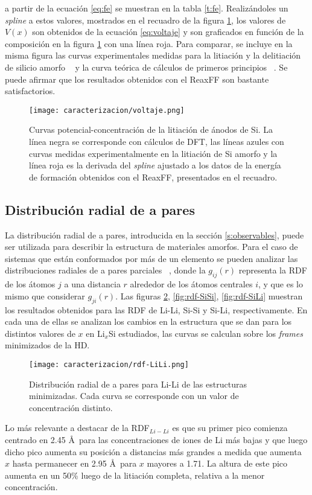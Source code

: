a partir de la ecuación \ref{eq:fe} se muestran en la tabla \ref{t:fe}. 
Realizándoles un \textit{spline} a estos valores, mostrados en el recuadro de la
figura \ref{fig:voltaje}, los valores de $V(x)$ son obtenidos de la ecuación
\ref{eq:voltaje} y son graficados en función de la composición en la figura 
\ref{fig:voltaje} con una línea roja. Para comparar, se incluye en la misma figura
las curvas experimentales medidas para la litiación y la delitiación de silicio
amorfo ~\cite{hatchard2004} y la curva teórica de cálculos de primeros principios 
~\cite{chevrier2009}. Se puede afirmar que los resultados obtenidos con el ReaxFF 
son bastante satisfactorios.
\begin{figure}[th]
    \centering
    \texttt{[image: caracterizacion/voltaje.png]}
    \caption{Curvas potencial-concentración de la litiación de ánodos de Si.
    La línea negra se corresponde con cálculos de DFT, las líneas azules con 
    curvas medidas experimentalmente en la litiación de Si amorfo y la línea 
    roja es la derivada del \textit{spline} ajustado a los datos de la energía 
    de formación obtenidos con el ReaxFF, presentados en el recuadro.}
    \label{fig:voltaje}
\end{figure}

\subsection{Distribución radial de a pares}

La distribución radial de a pares, introducida en la sección \ref{s:observables},
puede ser utilizada para describir la estructura de materiales amorfos. Para el 
caso de sistemas que están conformados por más de un elemento se pueden analizar 
las distribuciones radiales de a pares parciales ~\cite{lamparter1995}, donde la 
$g_{ij}(r)$ representa la RDF de los átomos $j$ a una distancia $r$ alrededor de 
los átomos centrales $i$, y que es lo mismo que considerar $g_{ji}(r)$. Las 
figuras \ref{fig:rdf-LiLi}, \ref{fig:rdf-SiSi}, \ref{fig:rdf-SiLi} muestran los
resultados obtenidos para las RDF de Li-Li, Si-Si y Si-Li, respectivamente. En
cada una de ellas se analizan los cambios en la estructura que se dan para los
distintos valores de $x$ en Li$_x$Si estudiados, las curvas se calculan sobre los
\textit{frames} minimizados de la HD.

\begin{figure}[h!]
    \centering
    \texttt{[image: caracterizacion/rdf-LiLi.png]}
    \caption{Distribución radial de a pares para Li-Li de las estructuras 
    minimizadas. Cada curva se corresponde con un valor de concentración 
    distinto.}
    \label{fig:rdf-LiLi}
\end{figure}
Lo más relevante a destacar de la RDF$_{Li-Li}$ es que su primer pico comienza 
centrado en 2.45 \AA\ para las concentraciones de iones de Li más bajas y que 
luego dicho pico aumenta su posición a distancias más grandes a medida que aumenta 
$x$ hasta permanecer en 2.95 \AA\ para $x$ mayores a 1.71. La altura de este pico
aumenta en un 50\% luego de la litiación completa, relativa a la menor 
concentración.

